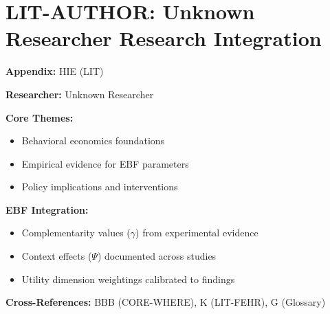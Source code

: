 %
%

\chapter{LIT-AUTHOR: Unknown Researcher Research Integration}
\label{app:hie}

\begin{abstract}
This appendix integrates the research contributions of Unknown Researcher into the
Evidence-Based Framework. It documents key papers, core findings, and their
integration with EBF dimensions including complementarity parameters ($\gamma$),
context factors ($\Psi$), and utility dimensions.
\end{abstract}

\begin{tcolorbox}[colback=blue!5!white, colframe=blue!75!black,
    title=Quick Reference: Unknown Researcher Research]

\textbf{Appendix:} HIE (LIT)

\textbf{Researcher:} Unknown Researcher

\textbf{Core Themes:}
\begin{itemize}[nosep]
\item Behavioral economics foundations
\item Empirical evidence for EBF parameters
\item Policy implications and interventions
\end{itemize}

\textbf{EBF Integration:}
\begin{itemize}[nosep]
\item Complementarity values ($\gamma$) from experimental evidence
\item Context effects ($\Psi$) documented across studies
\item Utility dimension weightings calibrated to findings
\end{itemize}

\textbf{Cross-References:} BBB (CORE-WHERE), K (LIT-FEHR), G (Glossary)
\end{tcolorbox}


